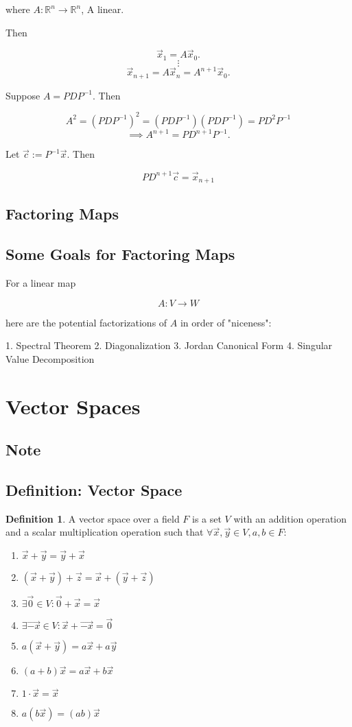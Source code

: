 \documentclass[a4paper,10pt]{article}
\theoremstyle{definition}
\newtheorem{definition}{Definition}[section]
\begin{document}
where $A : \mathbb{R}^n \rightarrow \mathbb{R}^n$, A linear.

Then

$$\vec{x}_1 = A\vec{x}_0.$$
$$\vdots$$
$$\vec{x}_{n+1} = A\vec{x}_n = A^{n+1}\vec{x}_0.$$

Suppose $A=PDP^{-1}$. Then

$$ A^2 = (PDP^{-1})^2 = (PDP^{-1})(PDP^{-1}) = PD^2P^{-1}$$
$$\implies A^{n+1} = PD^{n+1}P^{-1}.$$

Let $\vec{c} := P^{-1}\vec{x}$. Then

$$PD^{n+1}\vec{c} = \vec{x}_{n+1}$$

\subsection{Factoring Maps}
\subsection{Some Goals for Factoring Maps}
For a linear map

$$A : V \rightarrow W$$

here are the potential factorizations of $A$ in order of "niceness":

1. Spectral Theorem
2. Diagonalization
3. Jordan Canonical Form
4. Singular Value Decomposition

\section{Vector Spaces}
\subsection{Note}
\subsection{Definition: Vector Space}
\begin{definition}
	A vector space over a field $F$ is a set $V$ with an addition operation
and a scalar multiplication operation such that $\forall \vec{x},\vec{y} \in V,
a,b\in F:$
\begin{enumerate}
	\item $\vec{x} + \vec{y} = \vec{y} + \vec{x}$
	\item $(\vec{x} + \vec{y}) + \vec{z} = \vec{x} + (\vec{y} + \vec{z})$
	\item $\exists \vec{0} \in V : \vec{0} + \vec{x} = \vec{x}$
	\item $\exists \vec{-x} \in V : \vec{x} + \vec{-x} = \vec{0}$
	\item $a(\vec{x} + \vec{y}) = a\vec{x} + a\vec{y}$
	\item $(a+b)\vec{x} = a\vec{x} + b\vec{x}$
	\item $1 \cdot \vec{x} = \vec{x}$
	\item $a(b\vec{x}) = (ab)\vec{x}$
\end{enumerate}

\end{definition} 
\end{document}
